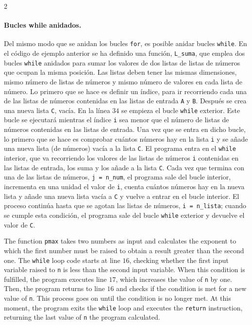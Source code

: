 \begin{paracol}{2}
\paragraph{Bucles while anidados.}  Del mismo modo que se anidan los bucles \texttt{for}, es posible anidar bucles \texttt{while}.
En el código de ejemplo anterior se ha definido una función, \texttt{L_suma}, que emplea dos bucles \texttt{while} anidados para sumar los valores de dos listas de listas de números que ocupan la misma posición. Las listas deben tener las mismas dimensiones, mismo número de listas de números y mismo número de valores en cada lista de número. Lo primero que se hace es definir un índice, para ir recorriendo cada una de las listas de números contenidas en las listas de entrada \texttt{A} y \texttt{B}. Después se crea una nueva lista \texttt{C}, vacía. En la línea $34$ se empieza el bucle \texttt{while} exterior. Este bucle se ejecutará mientras el índice \texttt{i} sea menor que el número de listas de números contenidas en las listas de entrada. Una vez que se entra en dicho bucle, lo primero que se hace es comprobar cuántos números hay en la lista \texttt{i} y se añade una nueva lista (de números) vacía a la lista \texttt{C}. El programa entra en el \texttt{while} interior, que va recorriendo los valores de las listas de números \texttt{i} contenidas en las listas de entrada, los suma y los añade a la lista \texttt{C}. Cada vez que termina con una de las listas de números, \texttt{j = n_num}, el programa sale del bucle interior, incrementa en una unidad el valor de \texttt{i}, cuenta cuántos números hay en la nueva lista y añade una nueva lista vacía a \texttt{C} y vuelve a entrar en el bucle interior. El proceso continúa hasta que se agotan las listas de números, \texttt{i = n_lista}; cuando se cumple esta condición, el programa sale del bucle \texttt{while} exterior y devuelve el valor de \texttt{C}.

\switchcolumn
The function \texttt{pmax} takes two numbers as input and calculates the exponent to which the first number must be raised to obtain a result greater than the second one. The \texttt{while} loop code starts at line $16$, checking whether the first input variable raised to \texttt{n} is less than the second input variable. When this condition is fulfilled, the program executes line $17$, which increases the value of \texttt{n} by one. Then, the program returns to line $16$ and checks if the condition is met for a new value of \texttt{n}. This process goes on until the condition is no longer met. At this moment, the program exits the \texttt{while} loop and executes the \texttt{return} instruction, returning the last value of \texttt{n} the program calculated.


\end{paracol}
